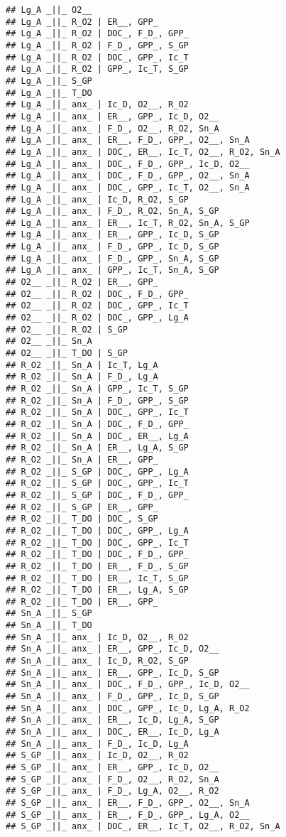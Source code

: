 \documentclass[]{article}
\begin{document}
\begin{verbatim}
## Lg_A _||_ O2__
## Lg_A _||_ R_O2 | ER__, GPP_
## Lg_A _||_ R_O2 | DOC_, F_D_, GPP_
## Lg_A _||_ R_O2 | F_D_, GPP_, S_GP
## Lg_A _||_ R_O2 | DOC_, GPP_, Ic_T
## Lg_A _||_ R_O2 | GPP_, Ic_T, S_GP
## Lg_A _||_ S_GP
## Lg_A _||_ T_DO
## Lg_A _||_ anx_ | Ic_D, O2__, R_O2
## Lg_A _||_ anx_ | ER__, GPP_, Ic_D, O2__
## Lg_A _||_ anx_ | F_D_, O2__, R_O2, Sn_A
## Lg_A _||_ anx_ | ER__, F_D_, GPP_, O2__, Sn_A
## Lg_A _||_ anx_ | DOC_, ER__, Ic_T, O2__, R_O2, Sn_A
## Lg_A _||_ anx_ | DOC_, F_D_, GPP_, Ic_D, O2__
## Lg_A _||_ anx_ | DOC_, F_D_, GPP_, O2__, Sn_A
## Lg_A _||_ anx_ | DOC_, GPP_, Ic_T, O2__, Sn_A
## Lg_A _||_ anx_ | Ic_D, R_O2, S_GP
## Lg_A _||_ anx_ | F_D_, R_O2, Sn_A, S_GP
## Lg_A _||_ anx_ | ER__, Ic_T, R_O2, Sn_A, S_GP
## Lg_A _||_ anx_ | ER__, GPP_, Ic_D, S_GP
## Lg_A _||_ anx_ | F_D_, GPP_, Ic_D, S_GP
## Lg_A _||_ anx_ | F_D_, GPP_, Sn_A, S_GP
## Lg_A _||_ anx_ | GPP_, Ic_T, Sn_A, S_GP
## O2__ _||_ R_O2 | ER__, GPP_
## O2__ _||_ R_O2 | DOC_, F_D_, GPP_
## O2__ _||_ R_O2 | DOC_, GPP_, Ic_T
## O2__ _||_ R_O2 | DOC_, GPP_, Lg_A
## O2__ _||_ R_O2 | S_GP
## O2__ _||_ Sn_A
## O2__ _||_ T_DO | S_GP
## R_O2 _||_ Sn_A | Ic_T, Lg_A
## R_O2 _||_ Sn_A | F_D_, Lg_A
## R_O2 _||_ Sn_A | GPP_, Ic_T, S_GP
## R_O2 _||_ Sn_A | F_D_, GPP_, S_GP
## R_O2 _||_ Sn_A | DOC_, GPP_, Ic_T
## R_O2 _||_ Sn_A | DOC_, F_D_, GPP_
## R_O2 _||_ Sn_A | DOC_, ER__, Lg_A
## R_O2 _||_ Sn_A | ER__, Lg_A, S_GP
## R_O2 _||_ Sn_A | ER__, GPP_
## R_O2 _||_ S_GP | DOC_, GPP_, Lg_A
## R_O2 _||_ S_GP | DOC_, GPP_, Ic_T
## R_O2 _||_ S_GP | DOC_, F_D_, GPP_
## R_O2 _||_ S_GP | ER__, GPP_
## R_O2 _||_ T_DO | DOC_, S_GP
## R_O2 _||_ T_DO | DOC_, GPP_, Lg_A
## R_O2 _||_ T_DO | DOC_, GPP_, Ic_T
## R_O2 _||_ T_DO | DOC_, F_D_, GPP_
## R_O2 _||_ T_DO | ER__, F_D_, S_GP
## R_O2 _||_ T_DO | ER__, Ic_T, S_GP
## R_O2 _||_ T_DO | ER__, Lg_A, S_GP
## R_O2 _||_ T_DO | ER__, GPP_
## Sn_A _||_ S_GP
## Sn_A _||_ T_DO
## Sn_A _||_ anx_ | Ic_D, O2__, R_O2
## Sn_A _||_ anx_ | ER__, GPP_, Ic_D, O2__
## Sn_A _||_ anx_ | Ic_D, R_O2, S_GP
## Sn_A _||_ anx_ | ER__, GPP_, Ic_D, S_GP
## Sn_A _||_ anx_ | DOC_, F_D_, GPP_, Ic_D, O2__
## Sn_A _||_ anx_ | F_D_, GPP_, Ic_D, S_GP
## Sn_A _||_ anx_ | DOC_, GPP_, Ic_D, Lg_A, R_O2
## Sn_A _||_ anx_ | ER__, Ic_D, Lg_A, S_GP
## Sn_A _||_ anx_ | DOC_, ER__, Ic_D, Lg_A
## Sn_A _||_ anx_ | F_D_, Ic_D, Lg_A
## S_GP _||_ anx_ | Ic_D, O2__, R_O2
## S_GP _||_ anx_ | ER__, GPP_, Ic_D, O2__
## S_GP _||_ anx_ | F_D_, O2__, R_O2, Sn_A
## S_GP _||_ anx_ | F_D_, Lg_A, O2__, R_O2
## S_GP _||_ anx_ | ER__, F_D_, GPP_, O2__, Sn_A
## S_GP _||_ anx_ | ER__, F_D_, GPP_, Lg_A, O2__
## S_GP _||_ anx_ | DOC_, ER__, Ic_T, O2__, R_O2, Sn_A

\end{verbatim}
\end{document}
